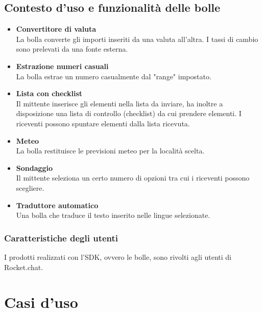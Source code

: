 \subsection{Contesto d'uso e funzionalità delle bolle}
\begin{itemize}
\item \textbf{Convertitore di valuta}\\
La bolla converte gli importi inseriti da una valuta all'altra. I tassi di cambio sono prelevati da una fonte esterna.
\item \textbf{Estrazione numeri casuali}\\
La bolla estrae un numero casualmente dal "range" impostato.
\item \textbf{Lista con checklist}\\
Il mittente inserisce gli elementi nella lista da inviare, ha inoltre a disposizione una lista di controllo (checklist) da cui prendere elementi. I riceventi possono spuntare elementi dalla lista ricevuta.
\item \textbf{Meteo}\\
 La bolla restituisce le previsioni meteo per la località scelta.
\item \textbf{Sondaggio}\\
Il mittente seleziona un certo numero di opzioni tra cui i riceventi possono scegliere.
\item \textbf{Traduttore automatico}\\
Una bolla che traduce il testo inserito nelle lingue selezionate.
\end{itemize}

\subsubsection{Caratteristiche degli utenti}
I prodotti realizzati con l'SDK, ovvero le bolle, sono rivolti agli
utenti di Rocket.chat.





\clearpage
\section{Casi d'uso}

\clearpage







